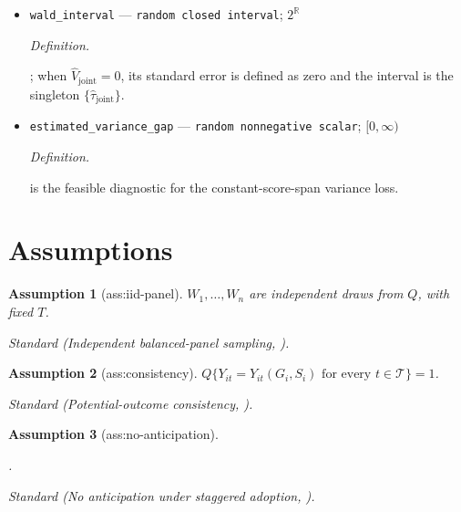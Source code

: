 \documentclass{article}
\newtheorem{assumption}{Assumption}
\begin{document}
\begin{itemize}
  \item \texttt{wald\_\allowbreak{}interval} --- \texttt{random closed interval}; \(2^{\mathbb R}\)
  \par\smallskip\noindent\emph{Definition.} \leavevmode\par\noindent {}\par\noindent; when \(\widehat V_{\mathrm{joint}}=0\), its standard error is defined as zero and the interval is the singleton \(\{\widehat\tau_{\mathrm{joint}}\}\).
  \item \texttt{estimated\_\allowbreak{}variance\_\allowbreak{}gap} --- \texttt{random nonnegative scalar}; \([0,\infty)\)
  \par\smallskip\noindent\emph{Definition.} \leavevmode\par\noindent {}\par\noindent is the feasible diagnostic for the constant-score-span variance loss.
\end{itemize}

\section{Assumptions}

\begin{assumption}[ass:iid-panel]\label{ass:iid-panel}
\(W_1,\ldots,W_n\) are independent draws from \(Q\), with fixed \(T\).
\par\smallskip\noindent\emph{Standard} (Independent balanced-panel sampling, \cite{OrtizVillavicencioSantAnna2025}).
\end{assumption}

\begin{assumption}[ass:consistency]\label{ass:consistency}
\(Q\{Y_{it}=Y_{it}(G_i,S_i)\text{ for every }t\in\mathcal T\}=1\).
\par\smallskip\noindent\emph{Standard} (Potential-outcome consistency, \cite{OldenMoen2022}).
\end{assumption}

\begin{assumption}[ass:no-anticipation]\label{ass:no-anticipation}
\leavevmode\par\noindent {}\par\noindent.
\par\smallskip\noindent\emph{Standard} (No anticipation under staggered adoption, \cite{OrtizVillavicencioSantAnna2025}).
\end{assumption}
\end{document}
